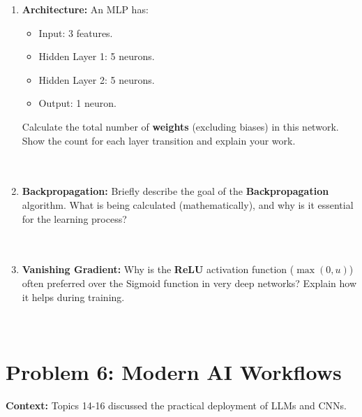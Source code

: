 \documentclass[12pt]{article}
\begin{document}
\begin{enumerate}[label=(\alph*)]
    \item \textbf{Architecture:} An MLP has:
    \begin{itemize}
        \item Input: 3 features.
        \item Hidden Layer 1: 5 neurons.
        \item Hidden Layer 2: 5 neurons.
        \item Output: 1 neuron.
    \end{itemize}
    Calculate the total number of \textbf{weights} (excluding biases) in this network. Show the count for each layer transition and explain your work. \\
    
    \fullunderline \\
    
    \fullunderline \\
    
    \fullunderline

    \item \textbf{Backpropagation:} Briefly describe the goal of the \textbf{Backpropagation} algorithm. What is being calculated (mathematically), and why is it essential for the learning process? \\
    
    \fullunderline \\
    
    \fullunderline \\

    \item \textbf{Vanishing Gradient:} Why is the \textbf{ReLU} activation function ($\max(0, u)$) often preferred over the Sigmoid function in very deep networks? Explain how it helps during training. \\
    
    \fullunderline \\
    
    \fullunderline \\
    
\end{enumerate}

\section{Problem 6: Modern AI Workflows}
\textbf{Context:} Topics 14-16 discussed the practical deployment of LLMs and CNNs.
\end{document}
